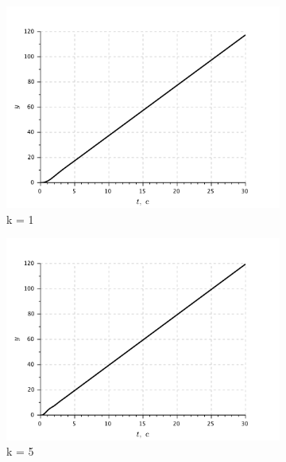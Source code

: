 \documentclass[a4paper, 11pt]{article}
\begin{document}
\begin{figure}[h!]
    \centering
    \begin{subfigure}{0.33\textwidth}
        \centering
        \includegraphics[width = \textwidth]{images/graph2-2-K1.pdf}
        \caption{k = 1}
    \end{subfigure}
    \begin{subfigure}{0.33\textwidth}
        \centering
        \includegraphics[width = \textwidth]{images/graph2-2-K5.pdf}
        \caption{k = 5}
    \end{subfigure}
    \begin{subfigure}{0.33\textwidth}
        \centering

\end{subfigure}
\end{figure}
\end{document}

